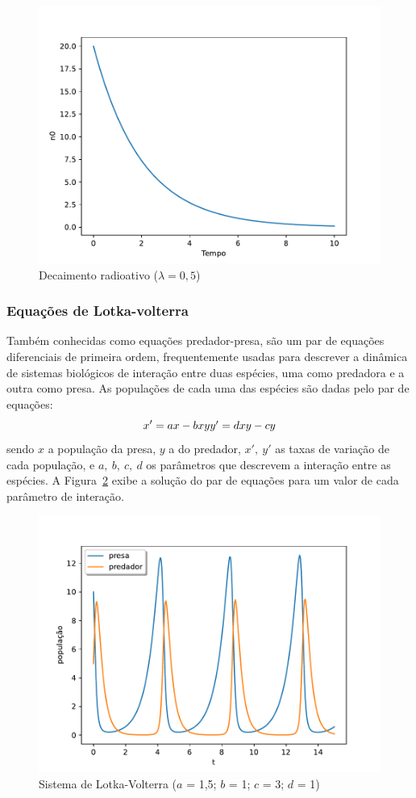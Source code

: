 \begin{figure}[tb]
	\centering
	\caption{Decaimento radioativo ($\lambda = 0,5$)}
	\label{fig:decaimento}
	\includegraphics[width=0.6\linewidth]{figs/decaimento}
\end{figure}

\subsubsection{Equações de Lotka-volterra}
Também conhecidas como equações predador-presa, são um par de equações diferenciais de primeira ordem, frequentemente usadas para descrever a dinâmica de sistemas biológicos de interação entre duas espécies, uma como predadora e a outra como presa. As populações de cada uma das espécies são dadas pelo par de equações:
\begin{equation}\label{eq:lotka_volterra}
	x' = ax - bxy
	$$$$
	y' = dxy - cy
\end{equation}
sendo $x$ a população da presa, $y$ a do predador, $x',\ y'$ as taxas de variação de cada população, e $a,\ b,\ c,\ d$ os parâmetros que descrevem a interação entre as espécies. A Figura~\ref{fig:lotka-volterra} exibe a solução do par de equações para um valor de cada parâmetro de interação.

\begin{figure}[tb]
	\centering
	\caption{Sistema de Lotka-Volterra ($a$ = 1,5; $b$ = 1; $c$ = 3; $d$ = 1)}
	\label{fig:lotka-volterra}
	\includegraphics[width=0.6\linewidth]{figs/lotka-volterra}
\end{figure}


